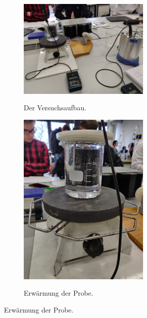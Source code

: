 \begin{figure}
    \centering
    \caption{Zwei Abbildungen zur Durchführung.}
    \begin{subfigure}{.475\textwidth}
        \centering
        \caption{Der Versuchsaufbau.}
        \includegraphics[width=0.7\textwidth]{content/data/Versuchsaufbau.png}
        \label{fig:aufbau}
    \end{subfigure}
    \begin{subfigure}{.475\textwidth}
        \centering
        \caption{Erwärmung der Probe.}
        \includegraphics[width=0.7\textwidth]{content/data/Becherglas.png}
        \label{fig:becher}
    \end{subfigure}
    \label{fig:aufbau_allgemein}
\end{figure}